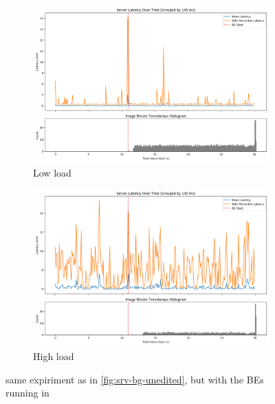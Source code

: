 \begin{figure}[t]
    \centering
    \begin{subfigure}[t]{0.49\columnwidth}
        \includegraphics[width=\columnwidth]{graphs/srv-bg-schedbe-low.png}
        \caption{Low load}\label{fig:srv-bg-schedbe-low}
    \end{subfigure}
    \hspace{\fill}
    \begin{subfigure}[t]{0.49\columnwidth}
        \includegraphics[width=\columnwidth]{graphs/srv-bg-schedbe-high.png}
        \caption{High load}\label{fig:srv-bg-schedbe-high}
    \end{subfigure}
    \vspace{4pt}
    \caption{same expiriment as in \autoref{fig:srv-bg-unedited}, but with the
    BEs running in \schedbe{}}\label{fig:srv-bg-schedbe}
\end{figure}


